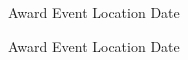 




\begin{cvhonors}

  \cvhonor
    {Award}
    {Event}
    {Location}
    {Date}

\end{cvhonors}




\begin{cvhonors}

  \cvhonor
    {Award}
    {Event}
    {Location}
    {Date}

\end{cvhonors}
